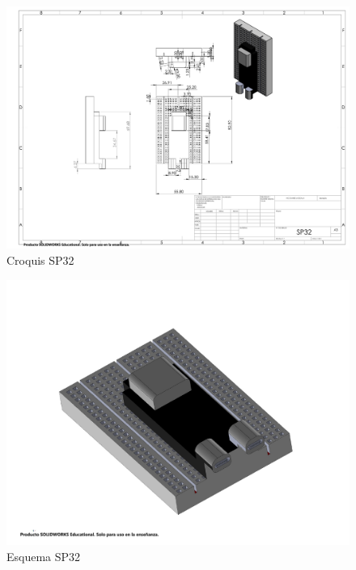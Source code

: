     \begin{figure}[H]
        \centering
        \includegraphics[trim = {1mm 1mm 1mm 1mm},clip,scale=0.2]{25/img/croquisEsp32.PDF}
        \caption{Croquis SP32}
        \label{Croquis:ESP32}
    \end{figure}
    \begin{figure}[H]
        \centering
        \includegraphics[trim = {10mm 10mm 10mm 10mm},clip,scale=0.2]{25/img/sp32.pdf}
        \caption{Esquema SP32}
        \label{fig:Esp32}
    \end{figure}
